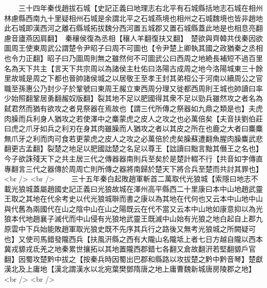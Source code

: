 　　三十四年秦伐趙拔石城【史記正義曰地理志右北平有石城縣括地志石城在相州林慮縣西南九十里疑相州石城是余謂北平之石城燕境也相州之石城魏境也皆非趙地此石城即漢西河之離石縣城拓拔魏分西河置五城郡又置石城縣蓋此地是也相息亮翻慮音廬燕因肩翻】　秦穰侯復為丞相【穰人羊翻復扶又翻】　楚欲與齊韓共伐秦因欲圖周王使東周武公謂楚令尹昭子曰周不可圖也【令尹楚上卿執其國之政猶秦之丞相也令力正翻】昭子曰乃圖周則無之雖然何不可圖武公曰西周之地絶長補短不過百里名為天下共主【言天下共宗周以為諸侯主杜佑曰洛陽古成周之地今洛陽城東三十餘里故城是周之下都也晉帥諸侯城之以居敬王至孝王封其弟桓公于河南以續周公之官職至孫惠公乃封少子於鞏號曰東周王赧立東西周分理又徙都西周則王城也帥讀曰率少始照翻鞏居勇翻赧奴版翻】裂其地不足以肥國得其衆不足以勁兵雖然攻之者名為弑君然而猶有欲攻之者見祭器在焉故也【謂三代所傳之祭器如九鼎之類是也】夫虎肉臊而兵利身人猶攻之若使澤中之麋蒙虎之皮人之攻之也必萬倍矣【夫音扶劉伯莊曰虎之爪牙如兵之利刃在身其肉雖臊而人猶攻之者以其皮之所在也鹿之大者曰麋麋無爪牙之利而肉可食若更蒙虎之皮人之攻之必萬倍於虎矣臊蘇遭翻魚腥肉臊麋武悲翻更古孟翻】裂楚之地足以肥國詘楚之名足以尊王【詘讀曰黜言黜其僭王之名也】今子欲誅殘天下之共主居三代之傳器器南則兵至矣於是楚計輟不行【共音如字傳直專翻言三代之器傳於周周亡則所傳之器將南歸於楚天下將合兵至楚而共討其罪也】<br />
<br />
　　三十五年秦白起敗趙軍斬首二萬取代光狼城【索隱曰地志不載光狼城蓋屬趙國史記正義曰光狼故城在澤州高平縣西二十里康曰本中山地趙武靈王取之其地在代余考史以代光狼城聨而書之康以為其地在代何也又云本中山地中山與代舊為兩國代在山之陰中山在山之陽既云在代不當又云本中山地如康意抑以為光狼本代地趙襄子滅代而中山侵有光狼地武靈王既滅中山始有光狼之地白起自上郡九原雲中下兵始能敗趙軍取光狼史既不先序其兵行之路後又無考光狼城之所闕疑可也】又使司馬錯發隴西兵【扶風汧縣之西有大隴山名隴坻上者七日方越自隴以西本冀戎䝠戎氐羌之地秦累世攘拓以其地置隴西郡錯七各翻又倉故翻汧若堅翻䝠戶官翻】因蜀攻楚黔中拔之【按秦兵時因蜀出巴郡和縣路以攻拔楚之黔中黔音琴】楚獻漢北及上庸地【漢北謂漢水以北宛葉樊鄧隋唐之地上庸曹魏新城唐房陵郡之地】<br />
<br />
